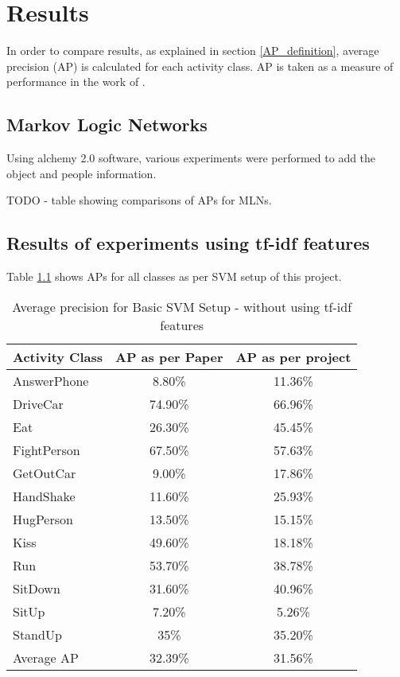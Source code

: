 \chapter{Results}

\label{ch5_RESULTS}
In order to compare results, as explained in section \ref{AP_definition}, 
average precision (AP) is calculated for each activity class. AP is
taken as a measure of performance in the work of \cite{actionsInContext}.

\section{Markov Logic Networks}
Using alchemy 2.0 software, various experiments were performed to add the object and people
information. 


TODO - table showing comparisons of APs for MLNs.




\section{Results of experiments using tf-idf features}
Table \ref{table:SVM_Setup} shows APs for all classes as per SVM setup of this project.

\begin{table}[t,here]
\centering
\captionsetup{justification=centering,margin=2cm}
\begin{tabular}{| l | c | c |}
\hline
{\bf Activity Class} & {\bf AP as per Paper} & {\bf AP as per project} \\ \hline
%
AnswerPhone & 8.80\% & 11.36\% \\ \hline
DriveCar & 74.90\% & 66.96\% \\ \hline
Eat & 26.30\% & 45.45\% \\ \hline
FightPerson & 67.50\% & 57.63\% \\ \hline
GetOutCar & 9.00\% & 17.86\% \\ \hline
HandShake & 11.60\% & 25.93\% \\ \hline
HugPerson & 13.50\% & 15.15\% \\ \hline
Kiss & 49.60\% & 18.18\% \\ \hline
Run & 53.70\% & 38.78\% \\ \hline
SitDown & 31.60\% & 40.96\% \\ \hline
SitUp & 7.20\% & 5.26\% \\ \hline
StandUp & 35\% & 35.20\% \\ \hline
Average AP & 32.39\% & 31.56\% \\ \hline
%
\end{tabular}
\caption{Average precision for Basic SVM Setup - without using tf-idf features}
\label{table:SVM_Setup}
\end{table}

